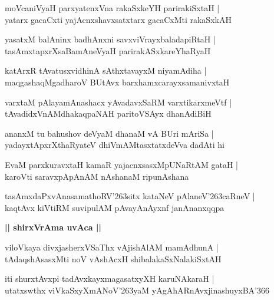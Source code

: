 \documentclass[twoside,12pt,openright]{book}
\def\S{\char'263}
\newcounter{shloka}[chapter]
\def\uvaca#1{\centerline{{\large\textbf{#1}}}}
\begin{document}
\begin{shloka}%
moVcaniVyaH parxyatenxVna rakaSxkeYH parirakiSxtaH |\\
yatarx gacaCxti yajAcnxshavxsatxtarx gacaCxMti rakaSxkAH 
\end{shloka}

\begin{shloka}%
yasatxM balAninx badhAnxni savxviVrayxbaladapiRtaH |\\
tasAmxtapxrXsaBamAneVyaH parirakASxkareYhaRyaH
\end{shloka}

\begin{shloka}%
katArxR tAvatusxvidhinA sAthxtavayxM niyamAdiha |\\
maqgashaqMgadharoV BUtAvx barxhamxcarayxsamanivxtaH 
\end{shloka}

\begin{shloka}%
varxtaM pAlayamAnashacx yAvadavxSaRM varxtikarxmeVtf |\\
tAvadidxVnAMdhakaqpaNAH paritoVSAyx dhanAdiBiH
\end{shloka}

\begin{shloka}%
ananxM tu bahushov deVyaM dhanaM vA BUri mAriSa |\\
yadayxtApxrXthaRyateV dhiVmAMtasxtatxdeVva dadAti hi 
\end{shloka}

\begin{shloka}%
EvaM parxkuravxtaH kamaR yajacnxsasxMpUNaRtAM gataH |\\
karoVti saravxpApAnAM nAshanaM ripunAshana
\end{shloka}

\begin{shloka}%
tasAmxdaPxvAnasamathoRV\S sitx kataNeV pAlaneV\S caRneV |\\
kaqtAvx kiVtiRM suvipulAM pAvayAnAyxnf janAnanxqqpa
\end{shloka}

\uvaca{|| shirxVrAma uvAca ||}

\begin{shloka}%
viloVkaya divxjasherxVSaThx vAjishAlAM mamAdhunA |\\
tAdaqshAsasxMti noV vAshAcxH shibalakaSxNalakiSxtAH 
\end{shloka}

\begin{shloka}%
iti shurxtAvxpi tadAvxkayxmagasatxyXH karuNAkaraH |\\
utatxswthx viVkaSxyXmANoV\S yaM yAgAhARnAvxjinashuyxBA\char'366
\end{shloka}
\end{document}
